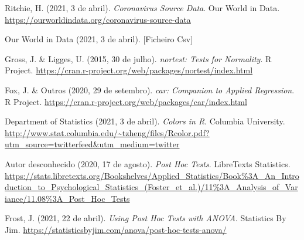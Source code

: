 \documentclass[conference]{IEEEtran}
\begin{document}
\begin{thebibliography}{00}

 Ritchie, H. (2021, 3 de abril). \textit{Coronavirus Source Data}. Our World in Data. \url{https://ourworldindata.org/coronavirus-source-data}

 Our World in Data (2021, 3 de abril). [Ficheiro Csv]

 Gross, J. \& Ligges, U. (2015, 30 de julho). \textit{nortest: Tests for Normality}. R Project. \url{https://cran.r-project.org/web/packages/nortest/index.html}

 Fox, J. \& Outros (2020, 29 de setembro). \textit{car: Companion to Applied Regression}. R Project. \url{https://cran.r-project.org/web/packages/car/index.html}

 Department of Statistics (2021, 3 de abril). \textit{Colors in R}. Columbia University. \url{http://www.stat.columbia.edu/~tzheng/files/Rcolor.pdf?utm_source=twitterfeed&utm_medium=twitter}

 Autor desconhecido (2020, 17 de agosto). \textit{Post Hoc Tests}. LibreTexts Statistics. \url{https://stats.libretexts.org/Bookshelves/Applied_Statistics/Book\%3A_An_Introduction_to_Psychological_Statistics_(Foster_et_al.)/11\%3A_Analysis_of_Variance/11.08\%3A_Post_Hoc_Tests}

 Frost, J. (2021, 22 de abril). \textit{Using Post Hoc Tests with ANOVA}. Statistics By Jim. \url{https://statisticsbyjim.com/anova/post-hoc-tests-anova/}

\end{thebibliography}
\end{document}
